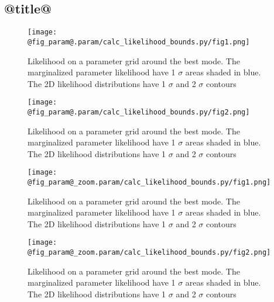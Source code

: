 \subsection{@title@}
\begin{figure}[H]
  \center\texttt{[image: @fig\_param@.param/calc\_likelihood\_bounds.py/fig1.png]}
  \caption{Likelihood on a parameter grid around the best mode. The marginalized parameter likelihood have
    1 $\sigma$ areas shaded in blue. The 2D likelihood distributions have 1 $\sigma$  and 2 $\sigma$ contours}
  \label{fig:basic_rd:likelihood}
\end{figure}

\begin{figure}[H]
  \center\texttt{[image: @fig\_param@.param/calc\_likelihood\_bounds.py/fig2.png]}
  \caption{Likelihood on a parameter grid around the best mode. The marginalized parameter likelihood have
    1 $\sigma$ areas shaded in blue. The 2D likelihood distributions have 1 $\sigma$  and 2 $\sigma$ contours}
  \label{fig:basic_rd:likelihood}
\end{figure}

\begin{figure}[H]
  \center\texttt{[image: @fig\_param@\_zoom.param/calc\_likelihood\_bounds.py/fig1.png]}
  \caption{Likelihood on a parameter grid around the best mode. The marginalized parameter likelihood have
    1 $\sigma$ areas shaded in blue. The 2D likelihood distributions have 1 $\sigma$  and 2 $\sigma$ contours}
  \label{fig:basic_rd:likelihood}
\end{figure}

\begin{figure}[H]
  \center\texttt{[image: @fig\_param@\_zoom.param/calc\_likelihood\_bounds.py/fig2.png]}
  \caption{Likelihood on a parameter grid around the best mode. The marginalized parameter likelihood have
    1 $\sigma$ areas shaded in blue. The 2D likelihood distributions have 1 $\sigma$  and 2 $\sigma$ contours}
  \label{fig:basic_rd:likelihood}
\end{figure}


